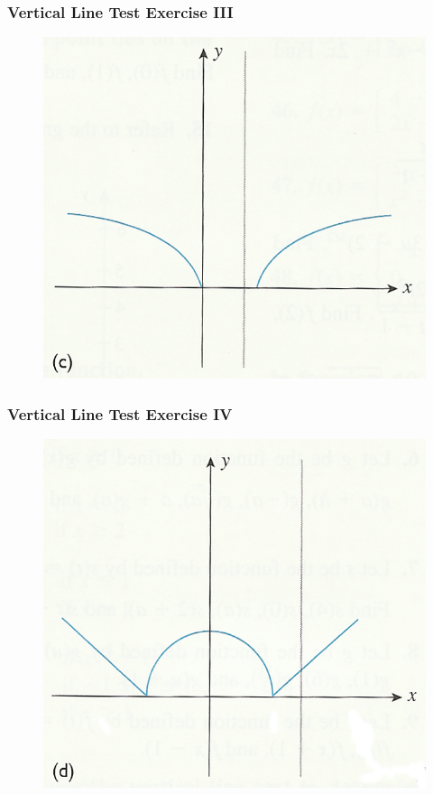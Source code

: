\documentclass[xcolor=dvipsnames]{beamer}
\begin{document}
\begin{frame}
  \frametitle{Vertical Line Test Exercise III}
  \begin{figure}[h]
    \includegraphics[scale=1]{./diagrams/vertical-03.png}
  \end{figure}
\end{frame}

\begin{frame}
  \frametitle{Vertical Line Test Exercise IV}
  \begin{figure}[h]
    \includegraphics[scale=1]{./diagrams/vertical-04.png}
  \end{figure}
\end{frame}
\end{document}
